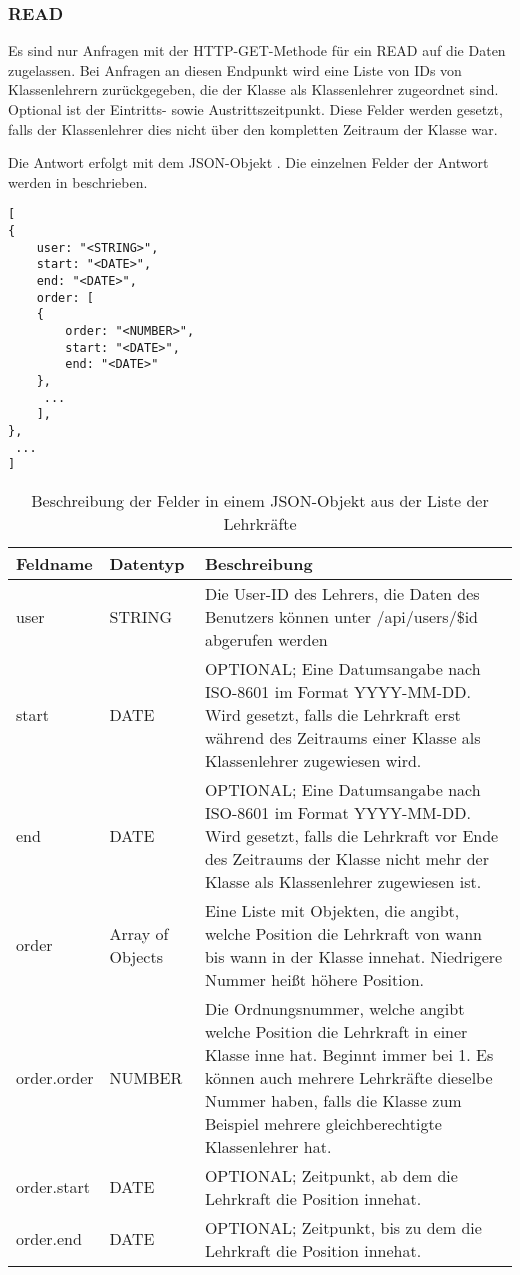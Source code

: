 \subsubsection{READ}
\label{sec:rest:api:classes:id:teachers:read}
Es sind nur Anfragen mit der HTTP-GET-Methode für ein READ auf die Daten zugelassen.
Bei Anfragen an diesen Endpunkt wird eine Liste von IDs von Klassenlehrern zurückgegeben, die der Klasse als Klassenlehrer zugeordnet sind.
Optional ist der Eintritts- sowie Austrittszeitpunkt. Diese Felder werden gesetzt, falls der Klassenlehrer dies nicht über den kompletten Zeitraum der Klasse war.

Die Antwort erfolgt mit dem JSON-Objekt . 
Die einzelnen Felder der Antwort werden in  beschrieben.

\begin{lstlisting}[caption={JSON-Antwort für einen GET-Aufruf des Pfads /api/classes/\$id/teachers},label={lst:code:rest:api:classes:id:teachers:read:ret},frame=tlrb]
[ 
{ 
	user: "<STRING>",
  	start: "<DATE>",
  	end: "<DATE>",
	order: [
	{
		order: "<NUMBER>",
    	start: "<DATE>",
    	end: "<DATE>"
	},
	 ...
	],
},
 ... 
]
\end{lstlisting}

\begin{longtable}{|p{}|p{}|p{}|}
		\caption{Beschreibung der Felder in einem JSON-Objekt aus der Liste der Lehrkräfte}
\endfoot
		\caption{Beschreibung der Felder in einem JSON-Objekt aus der Liste der Lehrkräfte}
		\label{tab:rest:api:classes:id:teachers:read:ret}
\endlastfoot 
\hline
			\textbf{Feldname} & \textbf{Datentyp} & \textbf{Beschreibung} \\ \hline
\endhead
user & STRING & Die User-ID des Lehrers, die Daten des Benutzers können unter /api/users/\$id abgerufen werden  \\ \hline
start & DATE & OPTIONAL; Eine Datumsangabe nach ISO-8601 im Format YYYY-MM-DD. Wird gesetzt, falls die Lehrkraft erst während des Zeitraums einer Klasse als Klassenlehrer zugewiesen wird. \\ \hline
end & DATE & OPTIONAL; Eine Datumsangabe nach ISO-8601 im Format YYYY-MM-DD. Wird gesetzt, falls die Lehrkraft vor Ende des Zeitraums der Klasse nicht mehr der Klasse als Klassenlehrer zugewiesen ist. \\ \hline
order & Array of Objects & Eine Liste mit Objekten, die angibt, welche Position die Lehrkraft von wann bis wann in der Klasse innehat. Niedrigere Nummer heißt höhere Position. \\ \hline
order.order & NUMBER & Die Ordnungsnummer, welche angibt welche Position die Lehrkraft in einer Klasse inne hat. Beginnt immer bei 1. Es können auch mehrere Lehrkräfte dieselbe Nummer haben, falls die Klasse zum Beispiel mehrere gleichberechtigte Klassenlehrer hat. \\ \hline
order.start & DATE & OPTIONAL; Zeitpunkt, ab dem die Lehrkraft die Position innehat. \\ \hline
order.end & DATE & OPTIONAL; Zeitpunkt, bis zu dem die Lehrkraft die Position innehat. \\ \hline
\end{longtable}

